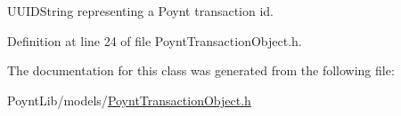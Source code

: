 U\+U\+I\+D\+String representing a Poynt transaction id. 



Definition at line 24 of file Poynt\+Transaction\+Object.\+h.



The documentation for this class was generated from the following file\+:\begin{DoxyCompactItemize}
\item 
Poynt\+Lib/models/\hyperlink{_poynt_transaction_object_8h}{Poynt\+Transaction\+Object.\+h}\end{DoxyCompactItemize}
